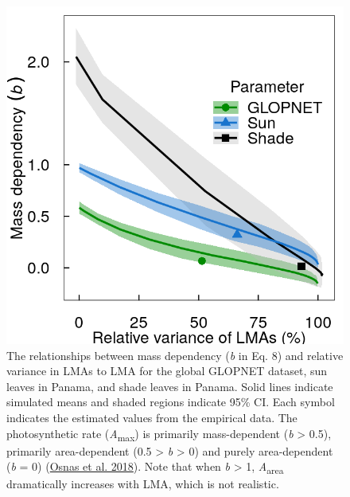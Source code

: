\documentclass[
  12pt,
  a4paper,
,tablecaptionabove
]{scrartcl}
\begin{document}
\newpage

\begin{figure}

{\centering \includegraphics{../figs/mass_prop_mv.png}

}

\caption{\label{fig-massplt}The relationships between mass dependency
(\emph{b} in Eq. 8) and relative variance in LMAs to LMA for the global
GLOPNET dataset, sun leaves in Panama, and shade leaves in Panama. Solid
lines indicate simulated means and shaded regions indicate 95\% CI. Each
symbol indicates the estimated values from the empirical data. The
photosynthetic rate (\emph{A}\textsubscript{max}) is primarily
mass-dependent (\emph{b} \textgreater{} 0.5), primarily area-dependent
(0.5 \textgreater{} \emph{b} \textgreater{} 0) and purely area-dependent
(\emph{b} = 0) (\protect\hyperlink{ref-Osnas2018}{Osnas et al. 2018}).
Note that when \emph{b} \textgreater{} 1, \emph{A}\textsubscript{area}
dramatically increases with LMA, which is not realistic.}

\end{figure}

\newpage
\end{document}
